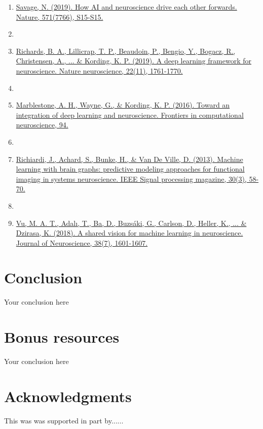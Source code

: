 \documentclass{article}
\begin{document}
\begin{itemize}
\begin{enumerate}
\item \href{https://www.nature.com/articles/d41586-019-02212-4 }{Savage, N. (2019). How AI and neuroscience drive each other forwards. Nature, 571(7766), S15-S15.} \cite{savage2019ai}
\item \item \href{https://www.nature.com/articles/s41593-019-0520-2}{Richards, B. A., Lillicrap, T. P., Beaudoin, P., Bengio, Y., Bogacz, R., Christensen, A., ... \& Kording, K. P. (2019). A deep learning framework for neuroscience. Nature neuroscience, 22(11), 1761-1770.} \cite{richards2019deep}
\item \item \href{https://www.frontiersin.org/articles/10.3389/fncom.2016.00094/pdf}{Marblestone, A. H., Wayne, G., \& Kording, K. P. (2016). Toward an integration of deep learning and neuroscience. Frontiers in computational neuroscience, 94.} \cite{marblestone2016toward}
\item \item \href{https://archive-ouverte.unige.ch/unige:33936/ATTACHMENT01}{Richiardi, J., Achard, S., Bunke, H., \& Van De Ville, D. (2013). Machine learning with brain graphs: predictive modeling approaches for functional imaging in systems neuroscience. IEEE Signal processing magazine, 30(3), 58-70.} \cite{richiardi2013machine}  
\item \item \href{https://www.jneurosci.org/content/jneuro/38/7/1601.full.pdf}{Vu, M. A. T., Adalı, T., Ba, D., Buzsáki, G., Carlson, D., Heller, K., ... \& Dzirasa, K. (2018). A shared vision for machine learning in neuroscience. Journal of Neuroscience, 38(7), 1601-1607.} \cite{vu2018shared}
\end{enumerate}

\end{itemize}
\section{Conclusion}
Your conclusion here

\section{Bonus resources}
Your conclusion here

\section*{Acknowledgments}
This was was supported in part by......

  
  
\end{document}
